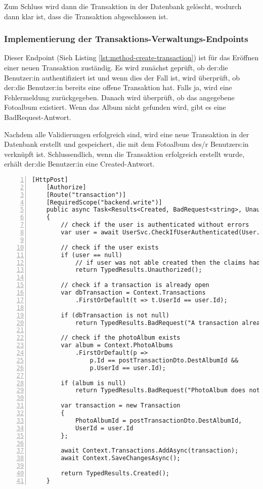 Zum Schluss wird dann die Transaktion in der Datenbank gelöscht, wodurch dann klar ist, dass
die Transaktion abgeschlossen ist.

\subsubsection{Implementierung der Transaktions-Verwaltungs-Endpoints}

Dieser Endpoint (Sieh Listing \ref{lst:method-create-transaction}) ist für das Eröffnen einer neuen Transaktion zuständig. Es wird zunächst 
geprüft, ob der:die Benutzer:in authentifiziert ist und wenn dies der Fall ist, wird überprüft, 
ob der:die Benutzer:in bereits eine offene Transaktion hat. Falls ja, wird eine Fehlermeldung 
zurückgegeben. Danach wird überprüft, ob das angegebene Fotoalbum existiert. Wenn das 
Album nicht gefunden wird, gibt es eine BadRequest-Antwort. 

Nachdem alle Validierungen erfolgreich sind, wird eine neue Transaktion in der 
Datenbank erstellt und gespeichert, die mit dem Fotoalbum des/r Benutzers:in verknüpft ist.
Schlussendlich, wenn die Transaktion erfolgreich erstellt wurde, erhält der:die Benutzer:in 
eine Created-Antwort.

\begin{lstlisting}[numbers=left,caption={Methode OpenTransaction},label={lst:method-create-transaction}]
    [HttpPost]
    [Authorize]
    [Route("transaction")]
    [RequiredScope("backend.write")]
    public async Task<Results<Created, BadRequest<string>, UnauthorizedHttpResult>> OpenTransaction([FromBody] PostTransactionDto postTransactionDto)
    {
        // check if the user is authenticated without errors
        var user = await UserSvc.CheckIfUserAuthenticated(User.Claims, true);
        
        // check if the user exists
        if (user == null) 
            // if user was not able created then the claims had an issue meaning unauthorized
            return TypedResults.Unauthorized();
        
        // check if a transaction is already open
        var dbTransaction = Context.Transactions
            .FirstOrDefault(t => t.UserId == user.Id);
        
        if (dbTransaction is not null)
            return TypedResults.BadRequest("A transaction already exists.");
        
        // check if the photoAlbum exists
        var album = Context.PhotoAlbums
            .FirstOrDefault(p => 
                p.Id == postTransactionDto.DestAlbumId && 
                p.UserId == user.Id);
        
        if (album is null)
            return TypedResults.BadRequest("PhotoAlbum does not exist");

        var transaction = new Transaction
        {
            PhotoAlbumId = postTransactionDto.DestAlbumId,
            UserId = user.Id
        };

        await Context.Transactions.AddAsync(transaction);
        await Context.SaveChangesAsync();
        
        return TypedResults.Created();
    }
\end{lstlisting}

